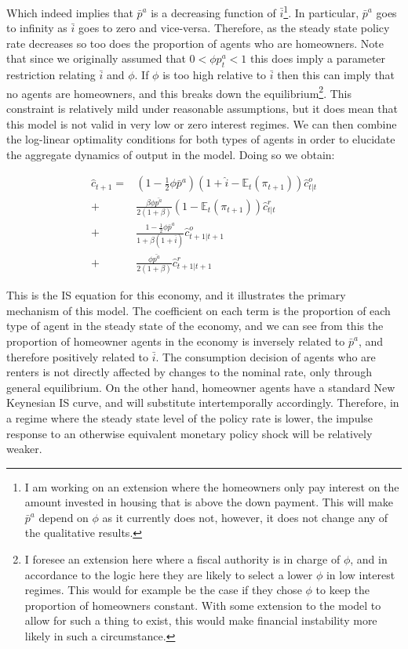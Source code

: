 \documentclass{article}
\begin{document}
Which indeed implies that $\bar{p}^a$ is a decreasing function of $\bar{i}$\footnote{I am working on an extension where the homeowners only pay interest on the amount invested in housing that is above the down payment. This will make $\bar{p}^a$ depend on $\phi$ as it currently does not, however, it does not change any of the qualitative results.}. In particular, $\bar{p}^a$ goes to infinity as $\bar{i}$ goes to zero and vice-versa. Therefore, as the steady state policy rate decreases so too does the proportion of agents who are homeowners. Note that since we originally assumed that $0 < \phi p^a_t < 1$ this does imply a parameter restriction relating $\bar{i}$ and $\phi$. If $\phi$ is too high relative to $\bar{i}$ then this can imply that no agents are homeowners, and this breaks down the equilibrium\footnote{I foresee an extension here where a fiscal authority is in charge of $\phi$, and in accordance to the logic here they are likely to select a lower $\phi$ in low interest regimes. This would for example be the case if they chose $\phi$ to keep the proportion of homeowners constant. With some extension to the model to allow for such a thing to exist, this would make financial instability more likely in such a circumstance.}. This constraint is relatively mild under reasonable assumptions, but it does mean that this model is not valid in very low or zero interest regimes. We can then combine the log-linear optimality conditions for both types of agents in order to elucidate the aggregate dynamics of output in the model. Doing so we obtain:

\begin{align}
    \hat{c}_{t+1} =& (1-\frac{1}{2} \phi \bar{p}^a)(1 +\hat{i} - \mathbb{E}_t (\pi_{t+1})) \hat{c}^o_{t|t} \nonumber \\
    +& \frac{\beta \phi \bar{p^a}}{2(1+\beta)} (1 - \mathbb{E}_t(\pi_{t+1})) \hat{c}^r_{t|t} \nonumber \\
    +& \frac{1-\frac{1}{2} \phi \bar{p}^a}{1 + \beta(1+\bar{i})} \hat{c}^o_{t+1|t+1} \nonumber \\
    +& \frac{\phi \bar{p^a}}{2(1+\beta)} \hat{c}^r_{t+1|t+1} \label{is_equation}
\end{align}

This is the IS equation for this economy, and it illustrates the primary mechanism of this model. The coefficient on each term is the proportion of each type of agent in the steady state of the economy, and we can see from this the proportion of homeowner agents in the economy is inversely related to $\bar{p}^a$, and therefore positively related to $\bar{i}$. The consumption decision of agents who are renters is not directly affected by changes to the nominal rate, only through general equilibrium. On the other hand, homeowner agents have a standard New Keynesian IS curve, and will substitute intertemporally accordingly. Therefore, in a regime where the steady state level of the policy rate is lower, the impulse response to an otherwise equivalent monetary policy shock will be relatively weaker.
\end{document}
